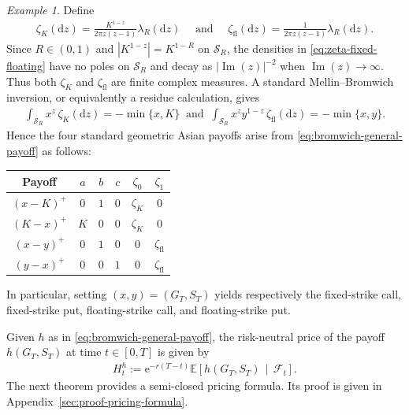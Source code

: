 \documentclass[10pt,a4paper,reqno]{amsart}
\theoremstyle{plain}
\theoremstyle{definition}
\theoremstyle{remark}
\theoremstyle{example}
\newtheorem{example}[theorem]{Example}
\begin{document}
\begin{example}\label{example:putcall}
 Define
\begin{align}\label{eq:zeta-fixed-floating}
    \zeta_K(\mathrm{d}z) = \frac{K^{1-z}}{2\pi z(z-1)} \lambda_R(\mathrm{d}z) \quad \text{ and } \quad  \zeta_{\mathrm{fl}}(\mathrm{d}z) = \frac{1}{2\pi z(z-1)} \lambda_R(\mathrm{d}z).
\end{align}
Since $R\in(0,1)$ and $|K^{1-z}| = K^{1-R}$ on $\mathcal{S}_R$, the densities in \eqref{eq:zeta-fixed-floating} have no poles on $\mathcal{S}_R$ and decay as $|\operatorname{Im}(z)|^{-2}$ when $\operatorname{Im}(z) \to \infty$. Thus both $\zeta_K$ and $\zeta_{\mathrm{fl}}$ are finite complex measures. A standard Mellin--Bromwich inversion, or equivalently a residue calculation, gives
\begin{align}\label{eq:bromwich-min-fixed}
    \int_{\mathcal{S}_R} x^z\,\zeta_K(\mathrm{d}z) = -\min\{x,K\} \ \text{ and } \ \int_{\mathcal{S}_R} x^z y^{1-z}\, \zeta_{\mathrm{fl}}(\mathrm{d}z) = -\min\{x,y\}.
\end{align}
Hence the four standard geometric Asian payoffs arise from
\eqref{eq:bromwich-general-payoff} as follows:
\begin{center}
\begin{tabular}{c|c|c|c|c|c}
    Payoff & $a$ & $b$ & $c$ & $\zeta_0$ & $\zeta_1$
    \\ \hline $(x-K)^+$ & $0$ & $1$ & $0$ & $\zeta_K$ & $0$
    \\ $(K-x)^+$ & $K$ & $0$ & $0$ & $\zeta_K$ & $0$ 
    \\ $(x-y)^+$ & $0$ & $1$ & $0$ & $0$ & $\zeta_{\mathrm{fl}}$ 
    \\ $(y-x)^+$ & $0$ & $0$ & $1$ & $0$ & $\zeta_{\mathrm{fl}}$
\end{tabular}
\end{center}
In particular, setting $(x,y)=(G_T,S_T)$ yields respectively the fixed-strike call, fixed-strike put, floating-strike call, and floating-strike put.
\end{example}

Given $h$ as in \eqref{eq:bromwich-general-payoff}, the risk-neutral price of the payoff $h(G_T, S_T)$ at time $t\in[0,T]$ is given by
\begin{align}\label{eq:general-payoff-price-definition}
    H_t^h := \mathrm{e}^{-r(T-t)} \mathbb{E}\left[ h(G_T,S_T) \,\middle|\, \mathcal{F}_t \right].
\end{align}
The next theorem provides a semi-closed pricing formula. Its proof is given in Appendix~\ref{sec:proof-pricing-formula}.
\end{document}
